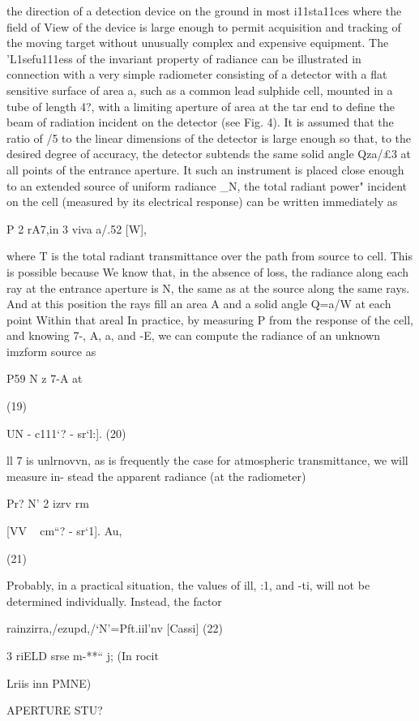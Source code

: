 the direction of a detection device on the ground
in most i11sta11ces where the field of View of the
device is large enough to permit acquisition and
tracking of the moving target without unusually
complex and expensive equipment.
The 'L1sefu111ess of the invariant property of
radiance can be illustrated in connection with a
very simple radiometer consisting of a detector
with a flat sensitive surface of area a, such as a
common lead sulphide cell, mounted in a tube of
length 4?, with a limiting aperture of area at the
tar end to define the beam of radiation incident
on the detector (see Fig. 4). It is assumed that
the ratio of /5 to the linear dimensions of the
detector is large enough so that, to the desired
degree of accuracy, the detector subtends the
same solid angle Qza/£3 at all points of the
entrance aperture. It such an instrument is
placed close enough to an extended source of
uniform radiance _N, the total radiant power"
incident on the cell (measured by its electrical
response) can be written immediately as

P 2 rA7,in 3 viva a/.52 [W],

where T is the total radiant transmittance over
the path from source to cell. This is possible
because We know that, in the absence of loss, the
radiance along each ray at the entrance aperture
is N, the same as at the source along the same
rays. And at this position the rays fill an area A
and a solid angle Q=a/W at each point Within
that areal In practice, by measuring P from the
response of the cell, and knowing 7-, A, a, and -E,
we can compute the radiance of an unknown
imzform source as

P59
N z
7-A at

(19)

UN - c111‘? - sr‘l:]. (20)

ll 7 is unlrnovvn, as is frequently the case for
atmospheric transmittance, we will measure in-
stead the apparent radiance (at the radiometer)

Pr?
N’ 2 izrv rm

[VV ~ cm“? - sr‘1].
Au,

(21)

Probably, in a practical situation, the values of
ill, :1, and -ti, will not be determined individually.
Instead, the factor

rainzirra,/ezupd,/‘N’=Pft.iil’nv [Cassi] (22)

3 riELD srse
m-**“ j; (In rocit

Lriis inn PMNE)

APERTURE STU?

